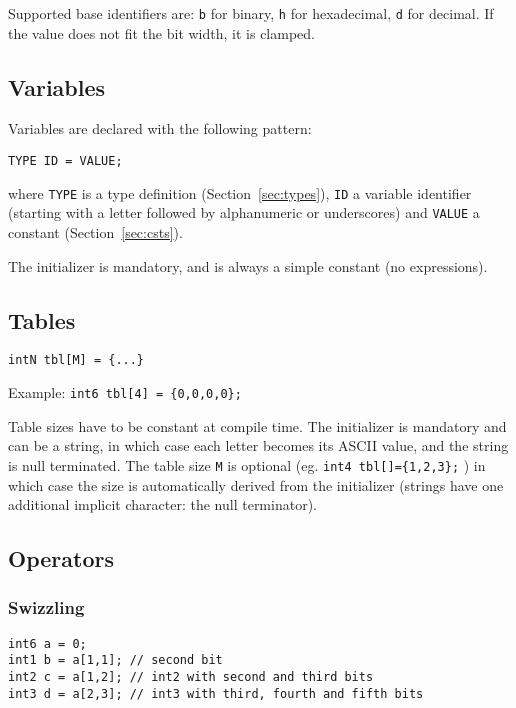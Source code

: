 \documentclass[a4]{article}
\begin{document}
Supported base identifiers are: \texttt{b} for binary, \texttt{h} for hexadecimal, \texttt{d} for decimal. If the value does not fit the bit width, it is clamped.

\subsection{Variables}

Variables are declared with the following pattern:

\texttt{TYPE ID = VALUE;}

\noindent where \texttt{TYPE} is a type definition (Section~\ref{sec:types}), \texttt{ID} a variable identifier (starting with a letter followed by alphanumeric or underscores) and \texttt{VALUE} a constant (Section~\ref{sec:csts}).

The initializer is mandatory, and is always a simple constant (no expressions).

\subsection{Tables}

\texttt{intN tbl[M] = \{...\} }

\noindent Example:  \texttt{int6 tbl[4] = \{0,0,0,0\};}

\noindent Table sizes have to be constant at compile time. The initializer is mandatory and can be a string, in which case each letter becomes its ASCII value, and the string is null terminated. The table size \texttt{M} is optional (eg. \texttt{int4 tbl[]=\{1,2,3\};} ) in which case the size is automatically derived from the initializer (strings have one additional implicit character: the null terminator).

\subsection{Operators}

\subsubsection{Swizzling}

\begin{verbatim}
int6 a = 0;
int1 b = a[1,1]; // second bit
int2 c = a[1,2]; // int2 with second and third bits
int3 d = a[2,3]; // int3 with third, fourth and fifth bits
\end{verbatim}
\end{document}
